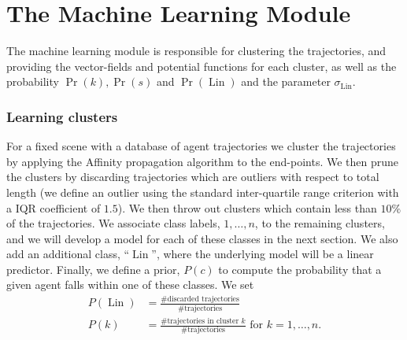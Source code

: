 \documentclass[12pt]{amsart}
\DeclareMathOperator{\Lin}{Lin}
\begin{document}
\section{The Machine Learning Module}
\label{app:learning}
The machine learning module is responsible for clustering the trajectories, and providing the vector-fields and potential functions for each cluster, as well as the probability $\Pr(k), \Pr(s)$ and $\Pr( \Lin)$ and the parameter $\sigma_{\Lin}$.

\subsubsection{Learning clusters}
For a fixed scene with a database of agent trajectories we cluster the trajectories by applying the Affinity propagation algorithm to the end-points.
We then prune the clusters by discarding trajectories which are outliers with respect to total length (we define an outlier using the standard inter-quartile range criterion with a IQR coefficient of $1.5$).
We then throw out clusters which contain less than $10\%$ of the trajectories.
We associate class labels, $1,\dots,n$,  to the remaining clusters, and we will develop a model for each of these classes in the next section.
We also add an additional class, ``$\Lin$'', where the underlying model will be a linear predictor.
Finally, we define a prior, $P(c)$ to compute the probability that a given agent falls within one of these classes.
We set 
\begin{align*}
	P(\Lin) &= \frac{ \text{\# discarded trajectories} }{ \text{ \# trajectories } } \\
	P(k) &= \frac{ \text{\# trajectories in cluster $k$} }{ \text{ \# trajectories } } \text{ for } k=1,\dots,n.
\end{align*}
\end{document}
